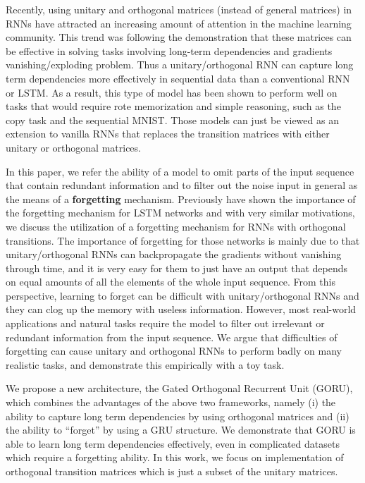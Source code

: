 \documentclass[letterpaper]{article} \usepackage{aaai18}  \usepackage{times}  \usepackage{helvet}  \usepackage{courier}  \usepackage{url}  \usepackage{graphicx}
\begin{document}
Recently, using unitary and orthogonal matrices (instead of general matrices) in RNNs \cite{arjovsky2015unitary,jing2016tunable,henaff2016orthogonal} have attracted an increasing amount of attention in the machine learning community. This trend was following the demonstration that these matrices can be effective in solving tasks involving long-term dependencies and gradients vanishing/exploding \cite{bengio1994learning,hochreiter1991untersuchungen} problem. Thus a unitary/orthogonal RNN can capture long term dependencies more effectively in sequential data than a conventional RNN or LSTM. As a result, this type of model has been shown to perform well on tasks that would require rote memorization\cite{hochreiter1991untersuchungen} and simple reasoning, such as the copy task\cite{hochreiter1997long} and the sequential MNIST\cite{le2015simple}. Those models can just be viewed as an extension to vanilla RNNs\cite{jordan1986serial} that replaces the transition matrices with either unitary or orthogonal matrices. 






In this paper, we refer the ability of a model to omit parts of the input sequence that contain redundant information and to filter out the noise input in general as the means of a {\bf forgetting} mechanism. Previously \cite{gers1999learning} have shown the importance of the forgetting mechanism for LSTM networks and with very similar motivations, we discuss the utilization of a forgetting mechanism for RNNs with orthogonal transitions. The importance of forgetting for those networks is mainly due to that unitary/orthogonal RNNs can backpropagate the gradients without vanishing through time, and it is very easy for them to just have an output that depends on equal amounts of all the elements of the whole input sequence.  From this perspective, learning to forget can be difficult with unitary/orthogonal RNNs and they can clog up the memory with useless information. However, most real-world applications and natural tasks require the model to filter out irrelevant or redundant information from the input sequence. We argue that difficulties of forgetting can cause unitary and orthogonal RNNs to perform badly on many realistic tasks, and demonstrate this empirically with a toy task.  




We propose a new architecture, the Gated Orthogonal Recurrent Unit (GORU), which combines the advantages of the above two frameworks, namely (i) the ability to capture long term dependencies by using orthogonal matrices and (ii) the ability to ``forget'' by using a GRU structure. We demonstrate that GORU is able to learn long term dependencies effectively, even in complicated datasets which require a forgetting ability. In this work, we focus on implementation of orthogonal transition matrices which is just a subset of the unitary matrices. 
\end{document}
